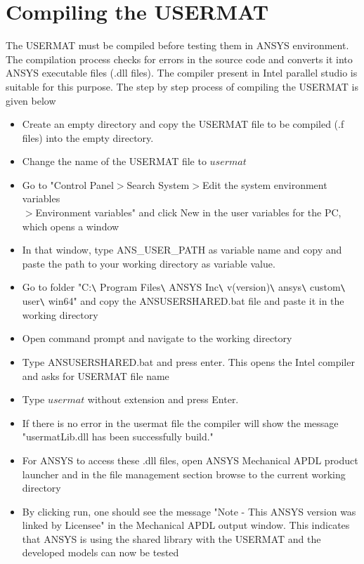 \documentclass[12pt,openright,twoside]{report}
\begin{document}
\section{Compiling the USERMAT}
\indent\indent\indent The USERMAT must be compiled before testing them in ANSYS environment. The compilation process checks for errors in the source code and converts it into ANSYS executable files (.dll files). The compiler present in Intel parallel studio is suitable for this purpose. The step by step process of compiling the USERMAT is given below
\begin{itemize}
\item Create an empty directory and copy the USERMAT file to be compiled (.f files) into the empty directory.
\item Change the name of the USERMAT file to $usermat$
\item Go to "Control Panel$>$Search System$>$Edit the system environment variables\\$>$Environment variables" and click New in the user variables for the PC, which opens a window
\item In that window, type ANS\_USER\_PATH as variable name and copy and paste the path to your working directory as variable value.
\item Go to folder "C:\texttt{\textbackslash} Program Files\texttt{\textbackslash} ANSYS Inc\texttt{\textbackslash} v(version)\texttt{\textbackslash} ansys\texttt{\textbackslash} custom\texttt{\textbackslash} user\texttt{\textbackslash} win64" and copy the ANSUSERSHARED.bat file and paste it in the working directory
\item Open command prompt and navigate to the working directory
\item Type ANSUSERSHARED.bat and press enter. This opens the Intel compiler and asks for USERMAT file name
\item Type $usermat$ without extension and press Enter.
\item If there is no error in the usermat file the compiler will show the message "usermatLib.dll has been successfully build."  
\item For ANSYS to access these .dll files, open ANSYS Mechanical APDL product launcher and in the file management section browse to the current working directory
\item By clicking run, one should see the message "Note - This ANSYS version was linked by Licensee" in the Mechanical APDL output window. This indicates that ANSYS is using the shared library with the USERMAT and the developed models can now be tested\\
\end{itemize} 
\end{document}
